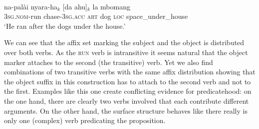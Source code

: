 \ea \label{}
\\
\gll na-palài nyara-ha$_k$ [da ahu]$_k$ la mbomang \\
\textsc{3}\textsc{sg}.\textsc{nom}-run chase-\textsc{3}\textsc{sg}.\textsc{acc} \textsc{art} dog \textsc{loc} space\_under\_house \\
\glft `He ran after the dogs under the house.' \\ 
\z

We can see that the affix set marking the subject and the object is distributed over both verbs. As the \textsc{run} verb is intransitive it seems natural that the object marker attaches to the second (the transitive) verb. Yet we also find combinations of two transitive verbs with the same affix distribution showing that the object suffix in this construction has to attach to the second verb and not to the first. Examples like this one create conflicting evidence for predicatehood: on the one hand, there are clearly two verbs involved that each contribute different arguments. On the other hand, the surface structure behaves like there really is only one (complex) verb predicating the proposition.

